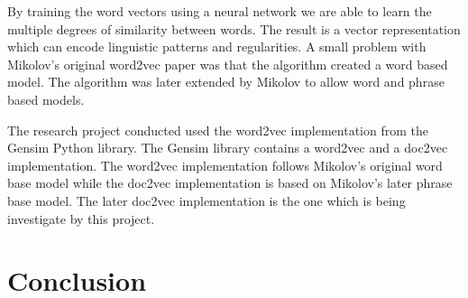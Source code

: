 By training the word vectors using a neural network we are able to learn the multiple degrees of similarity between words\cite{Mikolov1}.
The result is a vector representation which can encode linguistic patterns and regularities.\cite{Mikolov2}
A small problem with Mikolov's original word2vec paper was that the algorithm created a word based model.
The algorithm was later extended by Mikolov to allow word and phrase based models.\cite{Mikolov2}

The research project conducted used the word2vec implementation from the Gensim Python library.
The Gensim library contains a word2vec and a doc2vec implementation. The word2vec implementation follows Mikolov's original word base model while the doc2vec implementation is based on Mikolov's later phrase base model.\cite{radimDoc2Vec}
The later doc2vec implementation is the one which is being investigate by this project.


\section{Conclusion}
